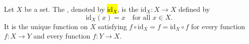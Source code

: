 \begin{definition} \label{definition:identity_function_on_a_set}
    Let $X$ be a set. The , denoted by \hl{$\mathrm{id}_X$}, is the  $\mathrm{id}_X : X \to X$ defined by
    $$
    \mathrm{id}_X(x) = x \quad \text{for all } x \in X.
    $$
    It is the unique function on $X$ satisfying $f \circ \mathrm{id}_X = f = \mathrm{id}_X \circ f$ for every function $f : X \to Y$ and every function $f : Y \to X$.
\end{definition}